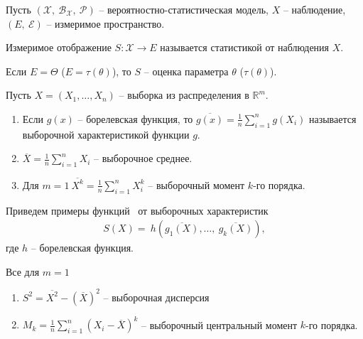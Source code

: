 Пусть $\displaystyle (\mathcal{X},\ \mathcal{B}_{\mathcal{X}},\ \mathcal{P})$ -- вероятностно-статистическая модель, $\displaystyle X$ -- наблюдение, $\displaystyle ( E,\ \mathcal{E})$ -- измеримое пространство.
\begin{definition}
Измеримое отображение $\displaystyle S:\mathcal{X}\rightarrow E$ называется статистикой от наблюдения $\displaystyle X$.
\end{definition}
\begin{definition}
Если $\displaystyle E=\Theta $ ($\displaystyle E=\tau ( \theta )$), то $\displaystyle S$ -- оценка параметра $\displaystyle \theta $ ($\displaystyle \tau ( \theta )$).
\end{definition}
\begin{example}
Пусть $\displaystyle X=( X_{1} ,\dotsc ,X_{n})$ -- выборка из распределения в $\displaystyle \mathbb{R}^{m}$.
\begin{enumerate}
    \item Если $\displaystyle g( x)$ -- борелевская функция, то $\displaystyle \overline{g( x)} =\frac{1}{n}\sum _{i=1}^{n} g( X_{i})$ называется выборочной характеристикой функции $\displaystyle g$.
    
    \item $\displaystyle \overline{X} =\frac{1}{n}\sum _{i=1}^{n} X_{i}$ -- выборочное среднее.
    
    \item Для $\displaystyle m=1\ \overline{X^{k}} =\frac{1}{n}\sum _{i=1}^{n} X_{i}^{k}$ -- выборочный момент $\displaystyle k$-го порядка.
\end{enumerate}
\end{example}
Приведем примеры функций \ от выборочных характеристик 
\begin{gather*}
    S( X) =\ h\left(\overline{g_{1}( X)} ,\dotsc,\ \overline{g_{k}( X)}\right),
\end{gather*}
где $h$ -- борелевская функция.
\begin{example}
Все для $\displaystyle m=1$
\begin{enumerate}
    \item $\displaystyle S^{2} =\overline{X^{2}} -(\overline{X})^{2}$ -- выборочная дисперсия
    
    \item $\displaystyle M_{k} =\frac{1}{n}\sum _{i=1}^n( X_{i} -\overline{X})^{k}$ -- выборочный центральный момент $\displaystyle k$-го порядка.
\end{enumerate}
\end{example}
